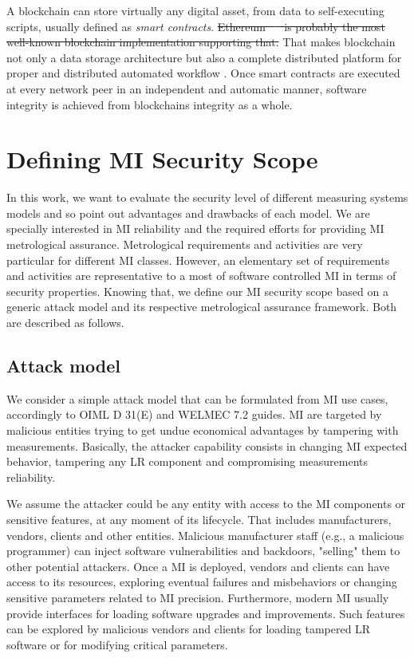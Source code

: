 \documentclass[journal]{IEEEtran} %
\providecommand{\DIFdel}[1]{{\protect\color{red}\sout{#1}}}                      %
\providecommand{\DIFdelbegin}{} %
\providecommand{\DIFdelend}{} %
\begin{document}
A blockchain can store virtually any digital asset, from data to self-executing scripts, usually defined as \emph{smart contracts}. \DIFdelbegin \DIFdel{Ethereum \mbox{%
\cite{Christidis2016} }%
is probably the most well-known blockchain implementation supporting that. }\DIFdelend %
That makes blockchain not only a data storage architecture but also a complete distributed platform for proper and distributed automated workflow \cite{Christidis2016}. 
Once smart contracts are executed at every network peer in an independent and automatic manner, software integrity is achieved from blockchains integrity as a whole. 

\section{Defining MI Security Scope}
In this work, we want to evaluate the security level of different measuring systems models and so point out advantages and drawbacks of each model. We are specially interested in MI reliability and the required efforts for providing MI metrological assurance. Metrological requirements and activities are very particular for different MI classes. However, an elementary set of requirements and activities are representative to a most of software controlled MI in terms of security properties. Knowing that, we define our MI security scope based on a generic attack model and its respective metrological assurance framework. Both are described as follows. %

\subsection{Attack model}
We consider a simple attack model that can be formulated from MI use cases, accordingly to OIML D 31(E) and WELMEC 7.2 guides. MI are targeted by malicious entities trying to get undue economical advantages by tampering with measurements. Basically, the attacker capability consists in changing MI expected behavior, tampering any LR component and compromising measurements reliability. 

We assume the attacker could be any entity with access to the MI components or sensitive features, at any moment of its lifecycle. 
That includes manufacturers, vendors, clients and other entities. Malicious manufacturer staff (e.g., a malicious programmer) can inject software vulnerabilities and backdoors, "selling" them to other potential attackers. 
Once a MI is deployed, vendors and clients can have access to its resources, exploring eventual failures and misbehaviors or changing sensitive parameters related to MI precision. 
Furthermore, modern MI usually provide interfaces for loading software upgrades and improvements.
Such features can be explored by malicious vendors and clients for loading tampered LR software or for modifying critical parameters.
\end{document}
